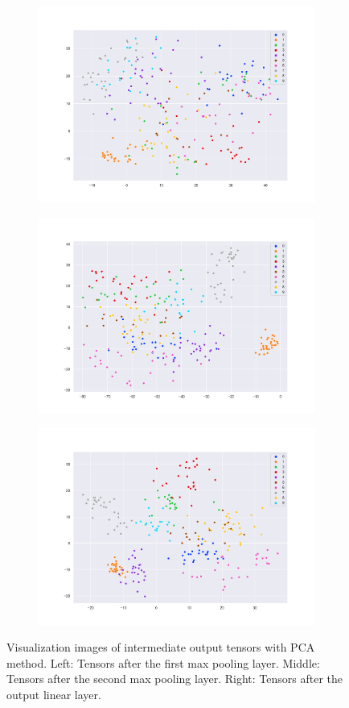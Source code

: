 \documentclass{article}
\begin{document}
\begin{figure}[htbp]
    \centering
    \begin{subfigure}
        \centering
        \includegraphics[width=0.32\linewidth]{../images/mnist_feature_map1_pca.png}
        \label{fig:mnist_pca_1}
    \end{subfigure}
    \begin{subfigure}
        \centering
        \includegraphics[width=0.32\linewidth]{../images/mnist_feature_map2_pca.png}
        \label{fig:mnist_pca_2}
    \end{subfigure}
    \begin{subfigure}
        \centering
        \includegraphics[width=0.32\linewidth]{../images/mnist_feature_map3_pca.png}
        \label{fig:mnist_pca_3}
    \end{subfigure}
    \caption{Visualization images of intermediate output tensors with PCA method. Left: Tensors after the first max pooling layer. Middle: Tensors after the second max pooling layer. Right: Tensors after the output linear layer.}
    \label{fig:mnist_pca}
\end{figure}
\end{document}
